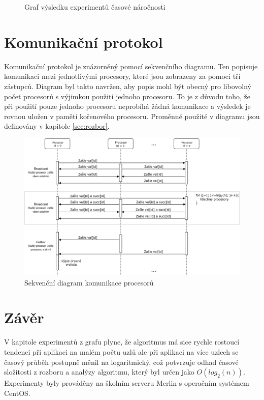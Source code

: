 \documentclass[12pt, a4paper]{article}
\begin{document}
\begin{figure}[H]\centering
	\label{fig:experimenty}
	\caption{Graf výsledku experimentů časové náročnosti}	
\end{figure}

\section{Komunikační protokol}
Komunikační protokol je znázorněný pomocí sekvenčního diagramu. Ten popisuje komunikaci mezi jednotlivými procesory, které jsou zobrazeny za pomoci tří zástupců. Diagram byl takto navržen, aby popis mohl být obecný pro libovolný počet procesorů s výjimkou použití jednoho procesoru. To je z důvodu toho, že při použití pouze jednoho procesoru neprobíhá žádná komunikace a výsledek je rovnou uložen v paměti kořenového procesoru. Proměnné použité v diagramu jsou definovány v kapitole \ref{sec:rozbor}.

\begin{figure}[H]
	\centering
	\includegraphics[scale=0.25]{pics/seq.png}
	\caption{Sekvenční diagram komunikace procesorů}	
\end{figure}


\section{Závěr}
V kapitole experimentů z grafu plyne, že algoritmus má sice rychle rostoucí tendenci při aplikaci na malém počtu uzlů ale při aplikaci na více uzlech se časový průběh postupně měnil na logaritmický, což potvrzuje odhad časové složitosti z rozboru a analýzy algoritmu, který byl určen jako $O(log_{2}(n))$. Experimenty byly prováděny na školním serveru Merlin s operačním systémem CentOS.
\end{document}
